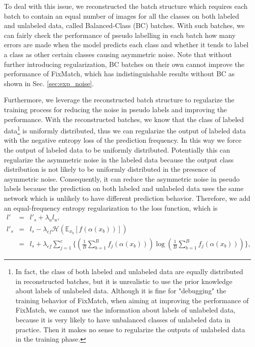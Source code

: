 To deal with this issue, we reconstructed the batch structure which requires each batch to contain an equal number of images for all the classes on both labeled and unlabeled data, called Balanced-Class (BC) batches. With such batches, we can fairly check the performance of pseudo labelling in each batch how many errors are made when the model predicts each class and whether it tends to label a class as other certain classes causing asymmetric noise. Note that without further introducing regularization, BC batches on their own cannot improve the performance of FixMatch, which has indistinguishable results without BC as shown in Sec. \ref{sec:exp_noise}.

Furthermore, we leverage the reconstructed batch structure to regularize the training process for reducing the noise in pseudo labels and improving the performance. With the reconstructed batches, we know that the class of labeled data\footnote{In fact, the class of both labeled and unlabeled data are equally distributed in reconstructed batches, but it is unrealistic to use the prior knowledge about labels of unlabeled data. Although it is fine for "debugging" the training behavior of FixMatch, when aiming at improving the performance of FixMatch, we cannot use the information about labels of unlabeled data, because it is very likely to have unbalanced classes of unlabeled data in practice. Then it makes no sense to regularize the outputs of unlabeled data in the training phase.} is uniformly distributed, thus we can regularize the output of labeled data with the negative entropy loss of the prediction frequency. In this way we force the output of labeled data to be uniformly distributed. Potentially this can regularize the asymmetric noise in the labeled data because the output class distribution is not likely to be uniformly distributed in the presence of asymmetric noise. Consequently, it can reduce the asymmetric noise in pseudo labels because the prediction on both labeled and unlabeled data uses the same network which is unlikely to have different prediction behavior. Therefore, we add an equal-frequency entropy regularization to the loss function, which is
\begin{eqnarray}
l' &=& l'_s + \lambda_u l_u \label{eq:eqr},\\
l'_s &=& l_s - \lambda_{ef} \mathcal{H}(\mathbb{E}_{x_b}[f(\alpha(x_b))]) \nonumber \\
&=&  l_s + \lambda_{ef} \sum_{j=1}^c\{(\frac{1}{B}\sum_{b=1}^Bf_j(\alpha(x_b))) \log (\frac{1}{B}\sum_{b=1}^B f_j(\alpha(x_b)))\}, \nonumber
\end{eqnarray}
